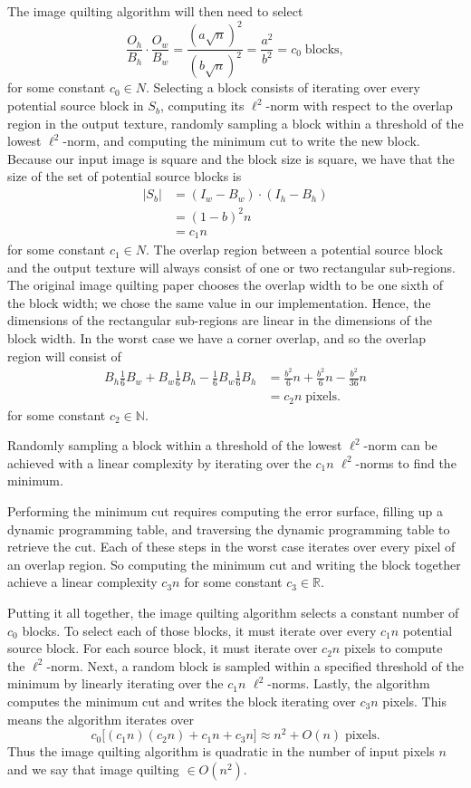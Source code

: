 \documentclass[letterpaper]{article}
\newcommand{\R}[0]{\mathbb{R}}
\newcommand{\N}[0]{\mathbb{N}}
\begin{document}
The image quilting algorithm will then need to select
\[
  \frac{O_h}{B_h} \cdot \frac{O_w}{B_w} = \frac{(a \sqrt{n})^2}{(b \sqrt{n})^2} = \frac{a^2}{b^2} = c_0 \; \text{blocks},
\]
for some constant $c_0 \in N$. Selecting a block consists of iterating over every potential source block in $S_b$, computing its $\ell ^2$-norm with respect to the overlap region in the output texture, randomly sampling a block within a threshold of the lowest $\ell ^2$-norm, and computing the minimum cut to write the new block. Because our input image is square and the block size is square, we have that the size of the set of potential source blocks is
\begin{align*}
  |S_b| & = (I_w - B_w) \cdot (I_h - B_h) \\
  & = (1-b) ^2 n \\
  & = c_1 n
\end{align*}
for some constant $c_1 \in N$. The overlap region between a potential source block and the output texture will always consist of one or two rectangular sub-regions. The original image quilting paper chooses the overlap width to be one sixth of the block width; we chose the same value in our implementation. Hence, the dimensions of the rectangular sub-regions are linear in the dimensions of the block width. In the worst case we have a corner overlap, and so the overlap region will consist of
\begin{align*}
  B_h \frac{1}{6} B_w + B_w \frac{1}{6} B_h - \frac{1}{6} B_w \frac{1}{6} B_h & = \frac{b^2}{6} n + \frac{b^2}{6} n - \frac{b^2}{36} n \\ & = c_2 n \; \text{pixels}.
\end{align*}
for some constant $c_2 \in \N$.

Randomly sampling a block within a threshold of the lowest $\ell ^2$-norm can be achieved with a linear complexity by iterating over the $c_1 n$ $\ell ^2$-norms to find the minimum.

Performing the minimum cut requires computing the error surface, filling up a dynamic programming table, and traversing the dynamic programming table to retrieve the cut. Each of these steps in the worst case iterates over every pixel of an overlap region. So computing the minimum cut and writing the block together achieve a linear complexity $c_3 n$ for some constant $c_3 \in \R$.

Putting it all together, the image quilting algorithm selects a constant number of $c_0$ blocks. To select each of those blocks, it must iterate over every $c_1 n$ potential source block. For each source block, it must iterate over $c_2 n$ pixels to compute the $\ell ^2$-norm. Next, a random block is sampled within a specified threshold of the minimum by linearly iterating over the $c_1 n$ $\ell ^2$-norms. Lastly, the algorithm computes the minimum cut and writes the block iterating over $c_3 n$ pixels. This means the algorithm iterates over
\[
  c_0 \big [(c_1 n)(c_2 n) + c_1 n + c_3 n \big ] \approx n^2 + O(n) \; \text{pixels}.
\]
Thus the image quilting algorithm is quadratic in the number of input pixels $n$ and we say that image quilting $ \in O(n^2)$.
\end{document}
